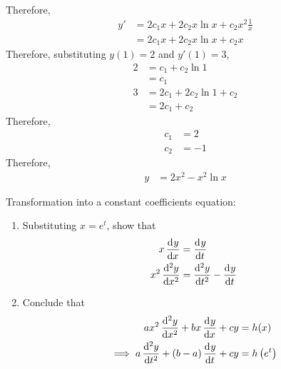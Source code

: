\documentclass[fleqn, a4paper, 11pt, oneside]{amsart}
\theoremstyle{definition}
\theoremstyle{theorem}
\begin{document}
\begin{solution}
\begin{enumerate}[leftmargin = *]
\begin{align*}
			\end{align*}
			Therefore,
			\begin{align*}
				y' & = 2 c_1 x + 2 c_2 x \ln x + c_2 x^2 \frac{1}{x} \\
                                   & = 2 c_1 x + 2 c_2 x \ln x + c_2 x
			\end{align*}
			Therefore, substituting $y(1) = 2$ and $y'(1) = 3$,
			\begin{align*}
				2 & = c_1 + c_2 \ln 1           \\
                                  & = c_1                       \\
				3 & = 2 c_1 + 2 c_2 \ln 1 + c_2 \\
                                  & = 2 c_1 + c_2
			\end{align*}
			Therefore,
			\begin{align*}
				c_1 & = 2 \\
				c_2 & = -1
			\end{align*}
			Therefore,
			\begin{align*}
				y & = 2 x^2 - x^2 \ln x
			\end{align*}
	\end{enumerate}
\end{solution}

\begin{question}
	Transformation into a constant coefficients equation:
	\begin{enumerate}
		\item
			Substituting $x = e^t$, show that
			\begin{align*}
				x \dod{y}{x}      & = \dod{y}{t} \\
				x^2 \dod[2]{y}{x} & = \dod[2]{y}{t} - \dod{y}{t}
			\end{align*}
		\item
			Conclude that
			\begin{align*}
				a x^2 \dod[2]{y}{x} + b x \dod{y}{x} + c y          & = h(x) \\
				\implies a \dod[2]{y}{t} + (b - a) \dod{y}{t} + c y & = h\left( e^t \right)
			\end{align*}
	\end{enumerate}
\end{question}
\end{document}
